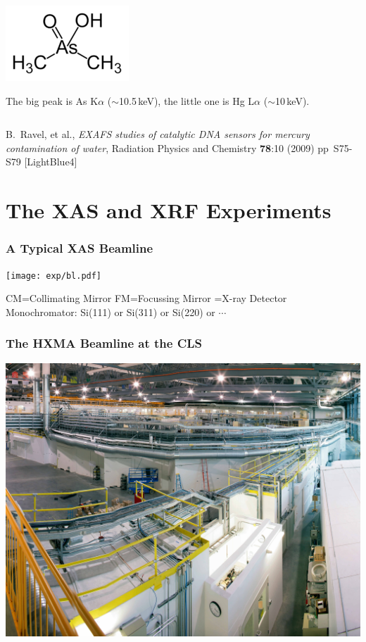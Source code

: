 \documentclass[10pt, xcolor=x11names, compress]{beamer}
\begin{document}
\begin{frame}
\begin{columns}
\begin{column}{0.5\linewidth}
\begin{center}
{          \includegraphics[width=0.35\linewidth]{images/cacodylate.png}

          \small
          The big peak is As K$\alpha$ ($\sim$10.5\,keV), the little one is
          Hg L$\alpha$ ($\sim$10\,keV).
        }
      \end{center}
    \end{column}
  \end{columns}
  \begin{bottomnote}[0.5][19]
    B.\ Ravel, et al., \textit{EXAFS studies of catalytic DNA sensors
      for mercury contamination of water}, Radiation Physics and
    Chemistry \textbf{78}:10 (2009) pp\ S75-S79
    [LightBlue4]
  \end{bottomnote}
\end{frame}

\section[Experiment]{The XAS and XRF Experiments}

\begin{frame}
  \frametitle{A Typical XAS Beamline}

  \begin{center}
    \texttt{[image: exp/bl.pdf]}

    CM=Collimating Mirror \quad FM=Focussing Mirror
    \quad {\color{Green4}$\Box$}=X-ray Detector\\
    Monochromator: Si(111) or Si(311) or Si(220) or $\cdots$
  \end{center}
\end{frame}
\begin{frame}
  \frametitle{The HXMA Beamline at the CLS}
  \begin{center}
    \includegraphics[width=0.8\linewidth]{exp/hxma.jpg}
  \end{center}
\end{frame}
\end{document}
